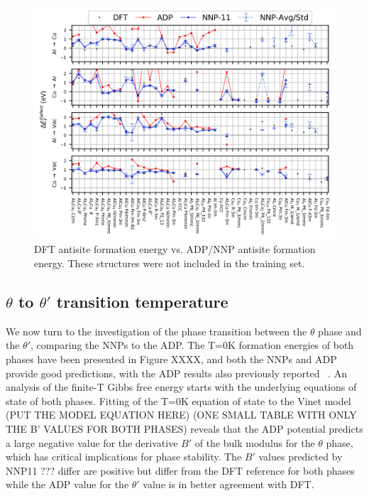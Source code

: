 \documentclass{article}
\begin{document}
\begin{figure}[H]%
\centering%
\includegraphics[width=1\textwidth,center]{figures/antisite_vacancies.png}%
\caption{DFT antisite formation energy vs. ADP/NNP antisite formation energy.
These structures were not included in the training set.}%
\label{fig:antisite_plot}
\end{figure}

\subsection{$\theta$ to $\theta'$ transition temperature} \label{sct:thetap_theta_transition}
We now turn to the investigation of the phase transition between the $\theta$ phase and the $\theta'$, comparing the NNPs to the ADP. The T=0K formation energies of both phases have been presented in Figure XXXX, and both the NNPs and ADP provide good predictions, with the ADP results also previously reported ~\cite{Apostol2011}. An analysis of the finite-T Gibbs free energy starts with the underlying equations of state of both phases.  Fitting of the T=0K equation of state to the Vinet model (PUT THE MODEL EQUATION HERE) (ONE SMALL TABLE WITH ONLY THE B' VALUES FOR BOTH PHASES) reveals that the ADP potential predicts a large negative value for the derivative $B'$ of the bulk modulus for the $\theta$ phase, which has critical implications for phase stability.  The $B'$ values predicted by NNP11 ??? differ are positive but differ from the DFT reference for both phases while the ADP value for the $\theta'$ value is in better agreement with DFT.
\end{document}
